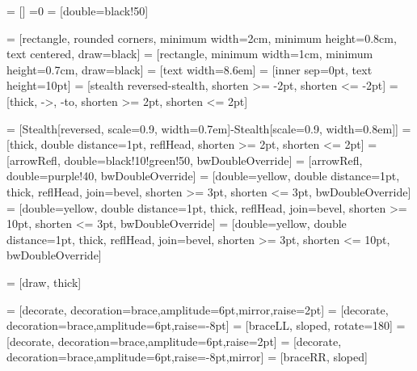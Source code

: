 \providecommand{\PoRArrowShortenDist}{3pt}
\providecommand{\PoRAcuteArrowShortenDist}{10pt}
\providecommand\BlackAndWhite{0}

 = []
=\BlackAndWhite
     = [double=black!50]
\fi

 = [rectangle, rounded corners, minimum width=2cm, minimum height=0.8cm, text centered, draw=black]%
 = [rectangle, minimum width=1cm, minimum height=0.7cm, draw=black]%
 = [text width=8.6em]%
 = [inner sep=0pt, text height=10pt]%
 = [stealth reversed-stealth, shorten >= -2pt, shorten <= -2pt]%
 = [thick, ->, -to, shorten >= 2pt, shorten <= 2pt]%

 = [{Stealth[reversed, scale=0.9, width=0.7em]}-{Stealth[scale=0.9, width=0.8em]}]
 = [thick, double distance=1pt, reflHead, shorten >= 2pt, shorten <= 2pt]%
 = [arrowRefl, double=black!10!green!50, bwDoubleOverride]%
 = [arrowRefl, double=purple!40, bwDoubleOverride]%
 = [double=yellow, double distance=1pt, thick, reflHead, join=bevel, shorten >= \PoRArrowShortenDist, shorten <= \PoRArrowShortenDist, bwDoubleOverride]%
 = [double=yellow, double distance=1pt, thick, reflHead, join=bevel, shorten >= \PoRAcuteArrowShortenDist, shorten <= \PoRArrowShortenDist, bwDoubleOverride]%
 = [double=yellow, double distance=1pt, thick, reflHead, join=bevel, shorten >= \PoRArrowShortenDist, shorten <= \PoRAcuteArrowShortenDist, bwDoubleOverride]%

 = [draw, thick]%

 = [decorate, decoration={brace,amplitude=6pt,mirror,raise=2pt}]%
 = [decorate, decoration={brace,amplitude=6pt,raise=-8pt}]%
 = [braceLL, sloped, rotate=180]%
 = [decorate, decoration={brace,amplitude=6pt,raise=2pt}]%
 = [decorate, decoration={brace,amplitude=6pt,raise=-8pt,mirror}]%
 = [braceRR, sloped]%

